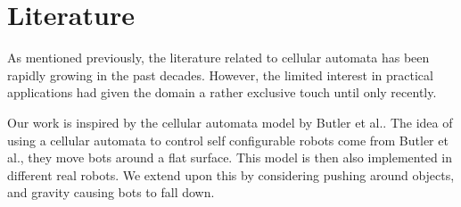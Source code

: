 \section{Literature}
\label{sec:lit}

As mentioned previously, the literature related to cellular automata has been rapidly growing in the past decades. However, the limited interest in practical applications had given the domain a rather exclusive touch until only recently. 

Our work is inspired by the cellular automata model by Butler et al.\cite{butler02}.
The idea of using a cellular automata to control self configurable robots
come from Butler et al., they move bots around a flat surface. This model is
then also implemented in different real robots. We extend upon this by
considering pushing around objects, and gravity causing bots to fall down.
